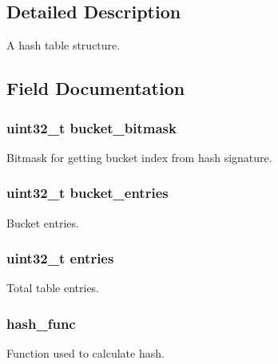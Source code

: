 \subsection{Detailed Description}
A hash table structure. 

\subsection{Field Documentation}
\hypertarget{structrte__hash_ace627da91a44de34422973f54013cb33}{}
\subsubsection[{bucket\+\_\+bitmask}]{\setlength{\rightskip}{0pt plus 5cm}uint32\+\_\+t bucket\+\_\+bitmask}\label{structrte__hash_ace627da91a44de34422973f54013cb33}
Bitmask for getting bucket index from hash signature. \hypertarget{structrte__hash_ad1c0b79e09e6b654bc7c268a9ec0084f}{}
\subsubsection[{bucket\+\_\+entries}]{\setlength{\rightskip}{0pt plus 5cm}uint32\+\_\+t bucket\+\_\+entries}\label{structrte__hash_ad1c0b79e09e6b654bc7c268a9ec0084f}
Bucket entries. \hypertarget{structrte__hash_a38bad35c844ffd72b0c1132715d5f3a1}{}
\subsubsection[{entries}]{\setlength{\rightskip}{0pt plus 5cm}uint32\+\_\+t entries}\label{structrte__hash_a38bad35c844ffd72b0c1132715d5f3a1}
Total table entries. \hypertarget{structrte__hash_aca908537bdd20d4ca4d4c7fd6c392903}{}
\subsubsection[{hash\+\_\+func}]{ hash\+\_\+func}\label{structrte__hash_aca908537bdd20d4ca4d4c7fd6c392903}
Function used to calculate hash. \hypertarget{structrte__hash_a01ac433d404852455c8fb211a4d43b2a}{}
